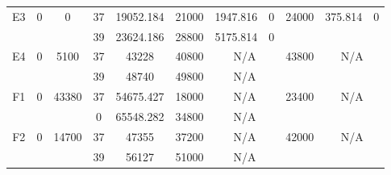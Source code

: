 \begin{sidewaystable}
\begin{tabular}{c||c|c||c|c|c|c|c||c|c|c}
         &
        
      \\
      \hline
      \multirow{2}{*}{E3} &
      \multirow{2}{*}{0} &
      \multirow{2}{*}{0} &
      37 &
      19052.184 &
      21000 &
        1947.816 &
        0 &
      \multirow{2}{*}{24000} &
        \multirow{2}{*}{375.814} &
        \multirow{2}{*}{0}
      \\
      \cline{4-8}
       &
       &
       &
      39 &
      23624.186 &
      28800 &
        5175.814 &
        0 &
      
         &
        
      \\
      \hline
      \multirow{2}{*}{E4} &
      \multirow{2}{*}{0} &
      \multirow{2}{*}{5100} &
      37 &
      43228 &
      40800 &
        \multicolumn{2}{|c||}{N/A} &
      \multirow{2}{*}{43800} &
        \multicolumn{2}{c}{\multirow{2}{*}{N/A}}
      \\
      \cline{4-8}
       &
       &
       &
      39 &
      48740 &
      49800 &
        \multicolumn{2}{|c||}{N/A} &
      
        
      \\
      \hline
      \multirow{2}{*}{F1} &
      \multirow{2}{*}{0} &
      \multirow{2}{*}{43380} &
      37 &
      54675.427 &
      18000 &
        \multicolumn{2}{|c||}{N/A} &
      \multirow{2}{*}{23400} &
        \multicolumn{2}{c}{\multirow{2}{*}{N/A}}
      \\
      \cline{4-8}
       &
       &
       &
      0 &
      65548.282 &
      34800 &
        \multicolumn{2}{|c||}{N/A} &
      
        
      \\
      \hline
      \multirow{2}{*}{F2} &
      \multirow{2}{*}{0} &
      \multirow{2}{*}{14700} &
      37 &
      47355 &
      37200 &
        \multicolumn{2}{|c||}{N/A} &
      \multirow{2}{*}{42000} &
        \multicolumn{2}{c}{\multirow{2}{*}{N/A}}
      \\
      \cline{4-8}
       &
       &
       &
      39 &
      56127 &
      51000 &
        \multicolumn{2}{|c||}{N/A} &
      
        
      \\
\end{tabular}
\label{table:RDS3.txt-12873.tex} 
\end{sidewaystable}